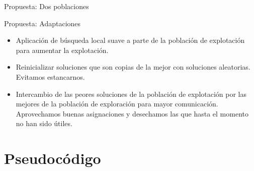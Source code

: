 \documentclass{beamer}
\begin{document}
\begin{frame}{Propuesta: Dos poblaciones}
\begin{minipage}{0.7\textwidth}
\begin{enumerate}
	\end{enumerate}
\end{minipage}

\end{frame}  

\begin{frame}{Propuesta: Adaptaciones}

\begin{itemize}

\item Aplicación de búsqueda local suave a parte de la población de explotación para aumentar la explotación.

\item Reinicializar soluciones que son copias de la mejor con soluciones aleatorias. Evitamos estancarnos.

\item Intercambio de las peores soluciones de la población de explotación por las mejores de la población de exploración para mayor comunicación. Aprovechamos buenas asignaciones y desechamos las que hasta el momento no han sido útiles.

\end{itemize}

\end{frame}
 
 
\section{Pseudocódigo}
\end{document}
